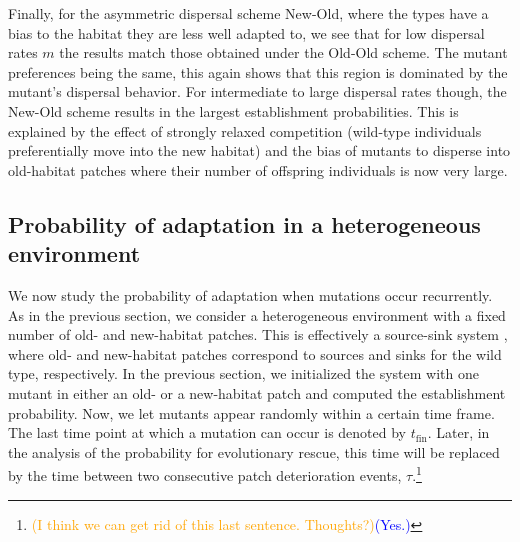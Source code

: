 \documentclass[11pt]{article}
\newcommand{\francois}[1]{\textcolor{blue}{(#1)}}
\newcommand{\pete}[1]{\textcolor{orange}{(#1)}}
\newcommand{\chg}[1]{\textcolor{change}{#1}}
\begin{document}
Finally, for the \chg{asymmetric dispersal scheme New-Old, where the types have a bias to the habitat they are less well adapted to, }we see that for low dispersal rates $m$ the results match those obtained under the \chg{Old-Old} scheme. The mutant preferences being the same, this again shows that this region is dominated by the mutant's dispersal behavior. For intermediate to large dispersal rates though, the \chg{New-Old} scheme results in the largest establishment probabilities. This is explained by the effect of strongly relaxed competition (wild-type individuals preferentially move into the new habitat) and the bias of mutants to disperse into old-habitat patches where their number of offspring individuals is now very large. %

\subsection*{Probability of adaptation in a heterogeneous environment} \label{subsec:source_sink}

We now study the probability of adaptation when mutations occur recurrently. As in the previous section, we consider a heterogeneous environment with a fixed number of old- and new-habitat patches. This is effectively a source-sink system \citep{holt_1985,pulliam_1988}, where old- and new-habitat patches correspond to sources and sinks for the wild type, respectively. In the previous section, we initialized the system with one mutant in either an old- or a new-habitat patch and computed the establishment probability. Now, we let mutants appear randomly within a certain time frame. The last time point at which a mutation can occur is denoted by $t_{\text{fin}}$.
Later, in the analysis of the probability for evolutionary rescue, this time will be replaced by the time between two consecutive patch deterioration events, $\tau$.\footnote{\pete{I think we can get rid of this last sentence. Thoughts?}\francois{Yes.}}
\end{document}
